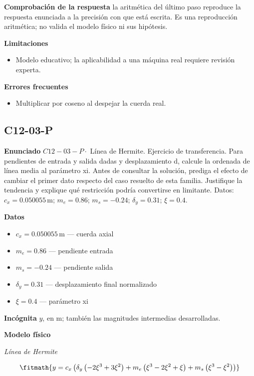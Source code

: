 \documentclass[10pt,openany]{book}
\begin{document}
\noindent\textbf{Comprobación de la respuesta} la aritmética del último paso reproduce la respuesta enunciada a la precisión con que está escrita. Es una reproducción aritmética; no valida el modelo físico ni sus hipótesis.

\noindent\textbf{Limitaciones}
\begin{itemize}
\item Modelo educativo; la aplicabilidad a una máquina real requiere revisión experta.
\end{itemize}

\noindent\textbf{Errores frecuentes}
\begin{itemize}
\item Multiplicar por coseno al despejar la cuerda real.
\end{itemize}
\subsection*{C12-03-P}

\noindent\textbf{Enunciado}
\(C12-03-P \cdot\) Línea de Hermite. Ejercicio de transferencia. Para pendientes de entrada y salida dadas y desplazamiento d, calcule la ordenada de línea media al parámetro xi. Antes de consultar la solución, prediga el efecto de cambiar el primer dato respecto del caso resuelto de esta familia. Justifique la tendencia y explique qué restricción podría convertirse en limitante. Datos: \(c_x=0.050055\, \mathrm{m}\); \(m_e=0.86\); \(m_s=-0.24\); \(\delta_y=0.31\); \(\xi=0.4\).

\noindent\textbf{Datos}
\begin{itemize}
\item $c_x = 0.050055\,\mathrm{m}$ — cuerda axial
\item $m_e = 0.86$ — pendiente entrada
\item $m_s = -0.24$ — pendiente salida
\item $\delta_y = 0.31$ — desplazamiento final normalizado
\item $\xi = 0.4$ — parámetro xi
\end{itemize}

\noindent\textbf{Incógnita}
$y$, en $\mathrm{m}$; también las magnitudes intermedias desarrolladas.

\noindent\textbf{Modelo físico}

\noindent\textit{Línea de Hermite}

\[
\fitmath{y=c_x \left(\delta_y \left(- 2 \xi^{3} + 3 \xi^{2}\right) + m_e \left(\xi^{3} - 2 \xi^{2} + \xi\right) + m_s \left(\xi^{3} - \xi^{2}\right)\right)}
\]
\end{document}

